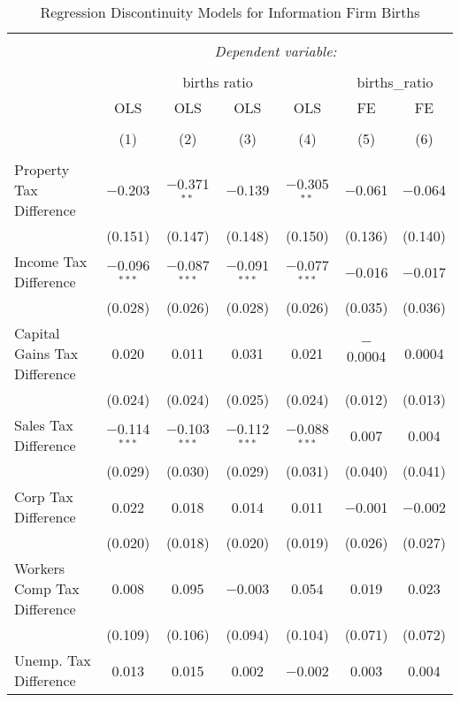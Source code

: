 
\begin{table}[!htbp] \centering 
  \caption{Regression Discontinuity Models for  Information Firm Births} 
  \label{51rd} 
\begin{tabular}{@{\extracolsep{5pt}}lcccccc} 
\\[-1.8ex]\hline 
\hline \\[-1.8ex] 
 & \multicolumn{6}{c}{\textit{Dependent variable:}} \\ 
\cline{2-7} 
\\[-1.8ex] & \multicolumn{4}{c}{births ratio} & \multicolumn{2}{c}{births\_ratio} \\ 
 & OLS & OLS & OLS & OLS & FE & FE \\ 
\\[-1.8ex] & (1) & (2) & (3) & (4) & (5) & (6)\\ 
\hline \\[-1.8ex] 
 Property Tax Difference & $-$0.203 & $-$0.371$^{**}$ & $-$0.139 & $-$0.305$^{**}$ & $-$0.061 & $-$0.064 \\ 
  & (0.151) & (0.147) & (0.148) & (0.150) & (0.136) & (0.140) \\ 
  Income Tax Difference & $-$0.096$^{***}$ & $-$0.087$^{***}$ & $-$0.091$^{***}$ & $-$0.077$^{***}$ & $-$0.016 & $-$0.017 \\ 
  & (0.028) & (0.026) & (0.028) & (0.026) & (0.035) & (0.036) \\ 
  Capital Gains Tax Difference & 0.020 & 0.011 & 0.031 & 0.021 & $-$0.0004 & 0.0004 \\ 
  & (0.024) & (0.024) & (0.025) & (0.024) & (0.012) & (0.013) \\ 
  Sales Tax Difference & $-$0.114$^{***}$ & $-$0.103$^{***}$ & $-$0.112$^{***}$ & $-$0.088$^{***}$ & 0.007 & 0.004 \\ 
  & (0.029) & (0.030) & (0.029) & (0.031) & (0.040) & (0.041) \\ 
  Corp Tax Difference & 0.022 & 0.018 & 0.014 & 0.011 & $-$0.001 & $-$0.002 \\ 
  & (0.020) & (0.018) & (0.020) & (0.019) & (0.026) & (0.027) \\ 
  Workers Comp Tax Difference & 0.008 & 0.095 & $-$0.003 & 0.054 & 0.019 & 0.023 \\ 
  & (0.109) & (0.106) & (0.094) & (0.104) & (0.071) & (0.072) \\ 
  Unemp. Tax Difference & 0.013 & 0.015 & 0.002 & $-$0.002 & 0.003 & 0.004 \\ 

\end{tabular}
\end{table}
